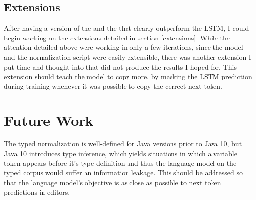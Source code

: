 \documentclass[11pt]{article}
\begin{document}
\subsection{Extensions}
After having a version of the \spn and the \lmatt that clearly outperform the LSTM, I could begin working on the extensions detailed in section \ref{extensions}. While the attention detailed above were working in only a few iterations, since the model and the normalization script were easily extensible, there was another extension I put time and thought into that did not produce the results I hoped for. This extension should teach the model to copy more, by masking the LSTM prediction during training whenever it was possible to copy the correct next token.


\section{Future Work}
The typed normalization is well-defined for Java versions prior to Java 10, but Java 10 introduces type inference, which yields situations in which a variable token appears before it's type definition and thus the language model on the typed corpus would suffer an information leakage. This should be addressed so that the language model's objective is as close as possible to next token predictions in editors.




\end{document}
